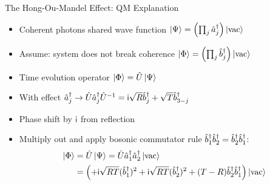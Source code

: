 \begin{frame}[t]{The Hong-Ou-Mandel Effect: QM Explanation}
%
\begin{itemize}
\item Coherent photons \Thus shared wave function
	\tabto{7cm} $ \ketIn  = \qty( \prod_j \cre[a]_j ) \vac $
\item Assume: system does not break coherence
	\tabto{7cm} $ \ketOut = \qty( \prod_j \cre[b]_j ) \vac $
\item	Time evolution operator
	\tabto{7cm} $ \ketOut = \opU \ketIn $
\item With effect
	\tabto{7cm} $ \cre_j \to \opU \cre_j \opU^{-1} = \iunit \sqrt{R} \cre[b]_j + \sqrt{T} \cre[b]_{3-j} $
\item Phase shift by $\iunit$ from reflection
\item Multiply out and apply bosonic commutator rule $\cre[b]_1 \cre[b]_2 = \cre[b]_2 \cre[b]_1$:
	\begin{align*}
		\textstyle
		\ketOut
	&=
		\opU \ketIn = \opU \cre_1 \cre_2 \vac \\
	&=
		\qty(
			+ \iunit \sqrt{RT} (\cre[b]_1)^2
			+ \iunit \sqrt{RT} (\cre[b]_2)^2
			+ (T - R) \cre[b]_2 \cre[b]_1
		) \vac
	\end{align*}
\end{itemize}
%
\end{frame}


